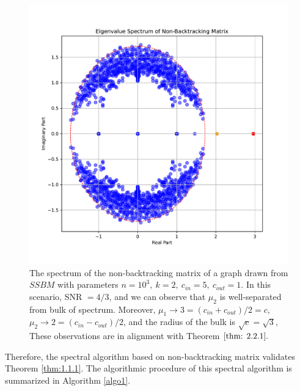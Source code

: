 \begin{figure}
    \centering
    \includegraphics[width=1\linewidth]{Figures/spectrum_plot.pdf}
    \caption[Spectrum Distribution of the Non-Backtracking Matrix]{The spectrum of the non-backtracking matrix of a graph drawn from $SSBM$ with parameters $n=10^3,~k=2,~c_{in}=5,~c_{out}=1.$ In this scenario, SNR $=4/3$, and we can observe that $\mu_2$ is well-separated from bulk of spectrum. Moreover, $\mu_1\to3=(c_{in}+c_{out})/2=c$, $\mu_2\to2=(c_{in}-c_{out})/2$, and the radius of the bulk is $\sqrt{c}=\sqrt{3},$ These observations are in alignment with Theorem $\ref{thm: 2.2.1}.$}
    \label{fig: spectrum}
\end{figure}

Therefore, the spectral algorithm based on non-backtracking matrix validates Theorem \ref{thm:1.1.1}. The algorithmic procedure of this spectral algorithm is summarized in Algorithm \ref{algo1}.


